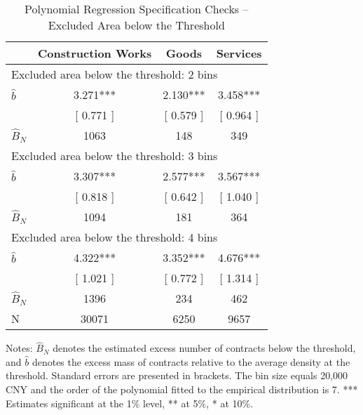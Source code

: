 \begin{table}[htbp]\centering
\caption{Polynomial Regression Specification Checks -- Excluded Area  below the Threshold}
\begin{tabular}{lccc}
\hline\hline
& Construction Works & Goods & Services \\
\hline
\multicolumn{4}{l}{Excluded area below the threshold: 2 bins} \\
\(\hat b\) &  3.271*** &  2.130*** &  3.458*** \\
& [  0.771 ] & [  0.579 ] & [  0.964 ] \\
\(\hat B_N\) &   1063 &    148 &    349 \\
\hline
\multicolumn{4}{l}{Excluded area below the threshold: 3 bins} \\
\(\hat b\) &  3.307*** &  2.577*** &  3.567*** \\
& [  0.818 ] & [  0.642 ] & [  1.040 ] \\
\(\hat B_N\) &   1094 &    181 &    364 \\
\hline
\multicolumn{4}{l}{Excluded area below the threshold: 4 bins} \\
\(\hat b\) &  4.322*** &  3.352*** &  4.676*** \\
& [  1.021 ] & [  0.772 ] & [  1.314 ] \\
\(\hat B_N\) &   1396 &    234 &    462 \\
\hline
N     &  30071     &   6250     &   9657 \\
\hline\hline
\end{tabular}
\begin{flushleft}\footnotesize Notes: $\hat B_N$ denotes the estimated excess number of contracts below the threshold, and $\hat b$ denotes the excess mass of contracts relative to the average density at the threshold. Standard errors are presented in brackets. The bin size equals 20,000 CNY and the order of the polynomial fitted to the empirical distribution is 7. *** Estimates significant at the 1\% level, ** at 5\%, * at 10\%.\end{flushleft}
\end{table}
